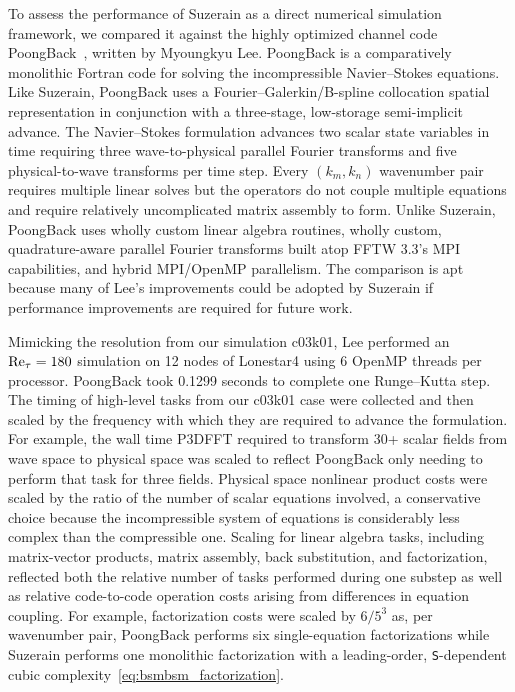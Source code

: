 To assess the performance of Suzerain as a direct numerical simulation
framework, we compared it against the highly optimized channel
code PoongBack~\citep{Lee2013Petascale, Lee2014Experiences}, written by
Myoungkyu Lee.  PoongBack is a comparatively monolithic Fortran code for solving
the incompressible Navier--Stokes equations.  Like
Suzerain, PoongBack uses a Fourier--Galerkin/B-spline collocation spatial
representation in conjunction with a three-stage, low-storage semi-implicit
advance.  The \citet{Kim1987Turbulence} Navier--Stokes formulation advances two scalar state
variables in time requiring three wave-to-physical parallel Fourier transforms
and five physical-to-wave transforms per time step.  Every $(k_m, k_n)$
wavenumber pair requires multiple linear solves but the operators do not couple
multiple equations and require relatively uncomplicated matrix assembly to form.
Unlike Suzerain, PoongBack uses wholly custom linear algebra routines,
wholly custom, quadrature-aware parallel Fourier transforms built atop FFTW
3.3's MPI capabilities, and hybrid MPI/OpenMP parallelism.  The comparison is
apt because many of Lee's improvements could be adopted by Suzerain if
performance improvements are required for future work.

Mimicking the resolution from our simulation c03k01, Lee
performed an $\Reynolds[\tau]=180$ simulation on 12 nodes of Lonestar4 using 6
OpenMP threads per processor.  PoongBack took 0.1299 seconds to complete one
Runge--Kutta step.  The timing of high-level tasks from our c03k01 case were
collected and then scaled by the frequency with which they are required to
advance the \citet{Kim1987Turbulence} formulation.  For example,
the wall time P3DFFT required to transform 30+ scalar fields from wave space to
physical space was scaled to reflect PoongBack only needing to perform that task
for three fields.
%
Physical space nonlinear product costs were scaled by the ratio of the number of
scalar equations involved, a conservative choice because the incompressible
system of equations is considerably less complex than the
compressible one.
%
%
%
Scaling for linear algebra tasks, including matrix-vector products, matrix
assembly, back substitution, and factorization, reflected both the relative
number of tasks performed during one substep as well as relative code-to-code
operation costs arising from differences in equation coupling.  For example,
factorization costs were scaled by $6/5^3$ as, per wavenumber pair, PoongBack
performs six single-equation factorizations while Suzerain performs one
monolithic factorization with a leading-order, \texttt{S}-dependent cubic
complexity~\eqref{eq:bsmbsm_factorization}.


